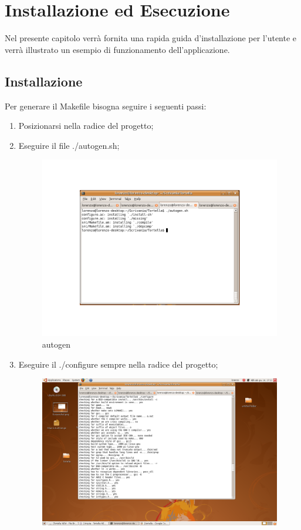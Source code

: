 \chapter{Installazione ed Esecuzione}
Nel presente capitolo verrà fornita una rapida guida d'installazione per l'utente e verrà illustrato un esempio di funzionamento dell'applicazione.
\section{Installazione}
Per generare il Makefile bisogna seguire i seguenti passi: 
\begin{enumerate}
\item Posizionarsi nella radice del progetto; 
\item Eseguire il file ./autogen.sh;
\begin{figure}[H]
\begin{center}
\includegraphics[scale=0.5]{etc/autogen}
\caption{autogen}
\label{autogen}
\end{center}
\end{figure}
\item Eseguire il ./configure sempre nella radice del progetto;
\begin{figure}[H]
\begin{center}
\includegraphics[scale=0.5]{etc/configure}

\end{center}
\end{figure}
\end{enumerate}
